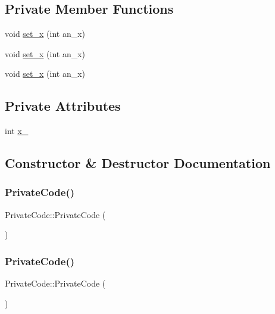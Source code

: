 \subsection*{Private Member Functions}
\begin{DoxyCompactItemize}
\item 
void \mbox{\hyperlink{class_private_code_a8d8ac6564d6425ea793f85848bb21b39}{set\+\_\+x}} (int an\+\_\+x)
\item 
void \mbox{\hyperlink{class_private_code_a8d8ac6564d6425ea793f85848bb21b39}{set\+\_\+x}} (int an\+\_\+x)
\item 
void \mbox{\hyperlink{class_private_code_a8d8ac6564d6425ea793f85848bb21b39}{set\+\_\+x}} (int an\+\_\+x)
\end{DoxyCompactItemize}
\subsection*{Private Attributes}
\begin{DoxyCompactItemize}
\item 
int \mbox{\hyperlink{class_private_code_a3590a614d8c76fa34fa4cea6f340c37f}{x\+\_\+}}
\end{DoxyCompactItemize}


\subsection{Constructor \& Destructor Documentation}
\mbox{\label{class_private_code_affe538411a99919d24ef09dffe1bb3eb}} 
\subsubsection{\texorpdfstring{PrivateCode()}{PrivateCode()}\hspace{0.1cm}{\footnotesize\ttfamily [1/3]}}
{\footnotesize\ttfamily Private\+Code\+::\+Private\+Code (\begin{DoxyParamCaption}{ }\end{DoxyParamCaption})}

\mbox{\label{class_private_code_affe538411a99919d24ef09dffe1bb3eb}} 
\subsubsection{\texorpdfstring{PrivateCode()}{PrivateCode()}\hspace{0.1cm}{\footnotesize\ttfamily [2/3]}}
{\footnotesize\ttfamily Private\+Code\+::\+Private\+Code (\begin{DoxyParamCaption}{ }\end{DoxyParamCaption})}

